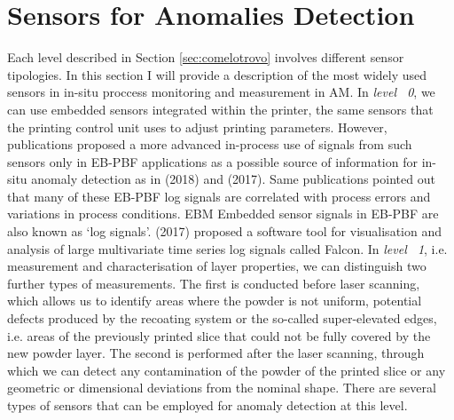 \section{Sensors for Anomalies Detection}
\label{sec:sensoriniiniini}
Each level described in Section \ref{sec:comelotrovo} involves different sensor tipologies. In this section I will provide a description of the most widely used sensors in in-situ proccess monitoring and measurement in AM. 
In \emph{level ~0}, we can use embedded sensors integrated within the printer, the same sensors that the printing control unit uses to adjust printing parameters. However, publications proposed a more advanced in-process use of signals from such sensors only in EB-PBF applications as a possible source of information for in-situ anomaly detection as in \citeauthor{grasso_data_2018} (2018) and \citeauthor{steed_falcon_2017} (2017). Same publications pointed out that many of these EB-PBF log signals are correlated with process errors and variations in process conditions. EBM Embedded sensor signals in EB-PBF are also known as ‘log signals’. \citeauthor{steed_falcon_2017} (2017) proposed a software tool for visualisation and analysis of large multivariate time series log signals called Falcon. In \emph{level ~1}, i.e. measurement and characterisation of layer properties, we can distinguish two further types of measurements. The first is conducted before laser scanning, which allows us to identify areas where the powder is not uniform, potential defects produced by the recoating system or the so-called super-elevated edges, i.e. areas of the previously printed slice that could not be fully covered by the new powder layer. The second is performed after the laser scanning, through which we can detect any contamination of the powder of the printed slice or any geometric or dimensional deviations from the nominal shape. There are several types of sensors that can be employed for anomaly detection at this level.

